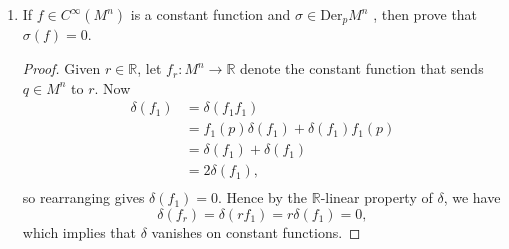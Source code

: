 \documentclass{article}
\begin{document}
\begin{enumerate}[label={\bf Q\arabic*:}]
\begin{enumerate}
\begin{proof}
          We first show that $\delta_{\vec{v}}$ is $\mathbb{R}$-linear: We
          can assume wlog that $\phi(p)=\overline{0}$. Let $f,g\in
          C^\infty(M^n)$, and $r\in\mathbb{R}$. Also, let $\sigma_r$ denote
          the map $\sigma_r:\mathbb{R}\rightarrow\mathbb{R}$ that sends
          $x\in\mathbb{R}$ to $rx\in\mathbb{R}$. Then
          \begin{align*}
            \delta_{\vec{v}}(rf+g)  &=\delta_{\vec{v}}(\sigma_r\circ f+g) \\
              &=D_p[(\sigma_r\circ f+g)\circ\phi^{-1}](v) \\
              &=D_p[(\sigma_r\circ f\circ\phi^{-1} +g\circ\phi^{-1}](v) \\
              &=rD_p[f\circ\phi^{-1}](v) +D_p[g\circ\phi^{-1}](v) \\
              &=r\delta_{\vec{v}}(f) +\delta_{\vec{v}}(g), \\
          \end{align*}
          and so $\delta_{\vec{v}}$ is $\mathbb{R}$-linear. Next, we check
          that $\delta_{\vec{v}}$ satisfies the product rule. We have
          \begin{align*}
            \delta_{\vec{v}}(f\cdot g) &=D_p[(f\cdot g)\circ\phi^{-1}](v) \\
              &=D_p[(f\circ\phi^{-1})\cdot(g\circ\phi^{-1})](v) \\
              &=(g\circ\phi^{-1})(\overline{0})D_p(f\circ\phi^{-1})(v)+
                (f\circ\phi^{-1})(\overline{0})D_p(g\circ\phi^{-1})(v) \\
              &=g(p)\delta_{\vec{v}}(f) +f(p)\delta_{\vec{v}}(g). \\
          \end{align*}
          Therefore, $\delta_{\vec{v}}\in\text{Der}_pM^n$.
        \end{proof}

      \item If $f\in C^\infty(M^n)$ is a constant function and $\sigma\in
        \text{Der}_pM^n$ , then prove that $\sigma(f)=0$.
        \begin{proof}
          Given $r\in\mathbb{R}$, let $f_r:M^n\rightarrow\mathbb{R}$
          denote the constant function that sends $q\in M^n$ to $r$. Now
          \begin{align*}
            \delta(f_1) &=\delta(f_1f_1) \\
              &=f_1(p)\delta(f_1) +\delta(f_1)f_1(p) \\
              &=\delta(f_1) +\delta(f_1) \\
              &=2\delta(f_1), \\
          \end{align*}
          so rearranging gives $\delta(f_1)=0$. Hence by the
          $\mathbb{R}$-linear property of $\delta$, we have
          \[\delta(f_r) =\delta(rf_1) =r\delta(f_1)=0,\] which implies that
          $\delta$ vanishes on constant functions.
        \end{proof}


\end{enumerate}
\end{enumerate}
\end{document}
